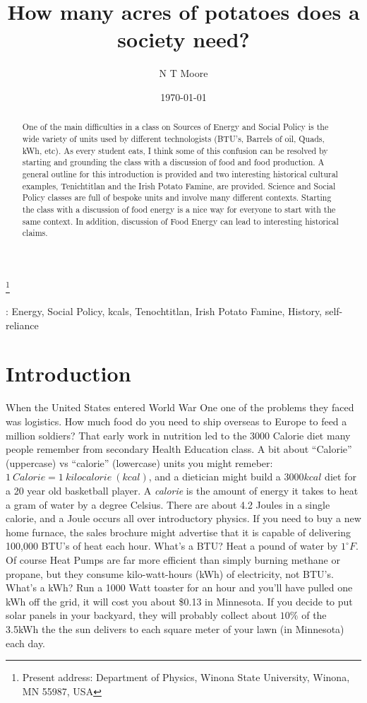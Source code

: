 \documentclass[12pt]{iopart}
\begin{document}
\title[How many acres of potatoes does a society need?]{How many acres of potatoes does a society need?}
\author{N T Moore}
\footnote{Present address:
Department of Physics, Winona State University, Winona, MN 55987, USA}
\date{\today}
\begin{abstract}
One of the main difficulties in a class on Sources of Energy and Social Policy is the wide variety of units used by different technologists (BTU's, Barrels of oil, Quads, kWh, etc).  As every student eats, I think some of this confusion can be resolved by starting and grounding the class with a discussion of food and food production.  A general outline for this introduction is provided and two interesting historical cultural examples, Tenichtitlan and the Irish Potato Famine, are provided.  
Science and Social Policy classes are full of bespoke units and involve many different contexts.  Starting the class with a discussion of food energy is a nice way for everyone to start with the same context.  In addition, discussion of Food Energy can lead to interesting historical claims. 
\end{abstract}
: Energy, Social Policy, kcals, Tenochtitlan, Irish Potato Famine, History, self-reliance
\submitto{\PED}
\maketitle

\section{Introduction}
When the United States entered World War One one of the problems they faced was logistics.  How much food do you need to ship overseas to Europe to feed a million soldiers?  That early work in nutrition led to the 3000 Calorie diet many people remember from secondary Health Education class.  A bit about ``Calorie'' (uppercase) vs ``calorie'' (lowercase) units you might remeber: $1~Calorie = 1~kilocalorie~(kcal)$, and a dietician might build a $3000 kcal$ diet for a 20 year old basketball player.  A \textit{calorie} is the amount of energy it takes  to heat a gram of water by a degree Celsius.  There are about 4.2 Joules in a single calorie, and a Joule occurs all over introductory  physics.  If you need to buy a new home furnace, the sales brochure might advertise that it is capable of delivering 100,000 BTU's of heat each hour.  What's a BTU? Heat a pound of water by $1^{\circ}F$.  Of course Heat Pumps are far more efficient than simply burning methane or propane, but they consume kilo-watt-hours (kWh) of electricity, not BTU's.  What's a kWh?  Run a 1000 Watt toaster for an hour and you'll have pulled one kWh off the grid, it will cost you about \$0.13 in Minnesota.  If you decide to put solar panels in your backyard, they will probably collect about $10\%$ of the 3.5kWh the  the sun delivers to each square meter of your lawn (in Minnesota) each day.  
\end{document}
